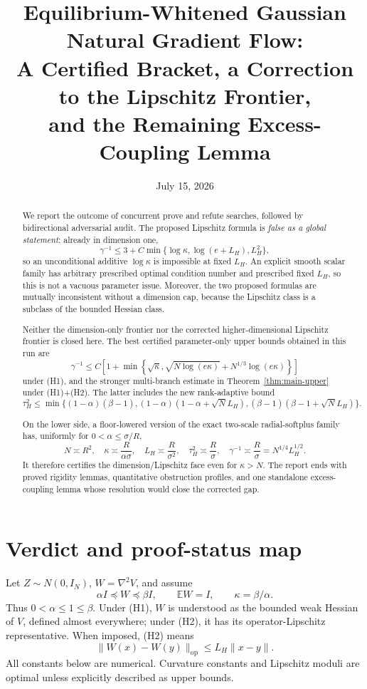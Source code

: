 \documentclass[11pt]{article}
\title{Equilibrium-Whitened Gaussian Natural Gradient Flow:\\
A Certified Bracket, a Correction to the Lipschitz Frontier,\\
and the Remaining Excess-Coupling Lemma}
\author{}
\date{July 15, 2026}
\numberwithin{equation}{section}
\newcommand{\E}{\mathbb E}
\newcommand{\op}{\mathrm{op}}
\begin{document}
\maketitle

\begin{abstract}
We report the outcome of concurrent prove and refute searches, followed by
bidirectional adversarial audit.  The proposed Lipschitz formula is
\emph{false as a global statement}: already in dimension one,
\[
 \gamma^{-1}\le 3+C\min\{\log\kappa,\log(e+L_H),L_H^2\},
\]
so an unconditional additive $\log\kappa$ is impossible at fixed $L_H$.
An explicit smooth scalar family has arbitrary prescribed optimal condition
number and prescribed fixed $L_H$, so this is not a vacuous parameter issue.
Moreover, the two proposed formulas are mutually inconsistent without a
dimension cap, because the Lipschitz class is a subclass of the bounded
Hessian class.

Neither the dimension-only frontier nor the corrected higher-dimensional
Lipschitz frontier is closed here.  The best certified parameter-only upper
bounds obtained in this run are
\[
 \gamma^{-1}\le C\left[1+\min\left\{\sqrt\kappa,
 \sqrt{N\log(e\kappa)}+N^{1/3}\log(e\kappa)\right\}\right]
\]
under (H1), and the stronger multi-branch estimate in
Theorem~\ref{thm:main-upper} under (H1)+(H2).  The latter includes the new
rank-adaptive bound
\[
 \tau_H^2\le
 \min\{(1-\alpha)(\beta-1),
 (1-\alpha)(1-\alpha+\sqrt N L_H),
 (\beta-1)(\beta-1+\sqrt N L_H)\}.
\]

On the lower side, a floor-lowered version of the exact two-scale
radial-softplus family has, uniformly for $0<\alpha\le\sigma/R$,
\[
 N\asymp R^2,\quad \kappa\asymp\frac{R}{\alpha\sigma},\quad
 L_H\asymp\frac{R}{\sigma^2},\quad
 \tau_H^2\asymp\frac R\sigma,\quad
 \gamma^{-1}\asymp\frac R\sigma
 =N^{1/4}L_H^{1/2}.
\]
It therefore certifies the dimension/Lipschitz face even for $\kappa>N$.
The report ends with proved rigidity lemmas, quantitative obstruction
profiles, and one standalone excess-coupling lemma whose resolution would
close the corrected gap.
\end{abstract}

\tableofcontents

\section{Verdict and proof-status map}\label{sec:verdict}

Let $Z\sim N(0,I_N)$, $W=\nabla^2V$, and assume
\begin{equation}\label{eq:H1}
 \alpha I\preceq W\preceq\beta I,\qquad \E W=I,\qquad
 \kappa=\beta/\alpha.
\end{equation}
Thus $0<\alpha\le1\le\beta$.  Under (H1), $W$ is understood as the bounded
weak Hessian of $V$, defined almost everywhere; under (H2), it has its
operator-Lipschitz representative.
When imposed, (H2) means
\begin{equation}\label{eq:H2}
 \|W(x)-W(y)\|_{\op}\le L_H\|x-y\|.
\end{equation}
All constants below are numerical.  Curvature constants and Lipschitz
moduli are optimal unless explicitly described as upper bounds.
\end{document}
